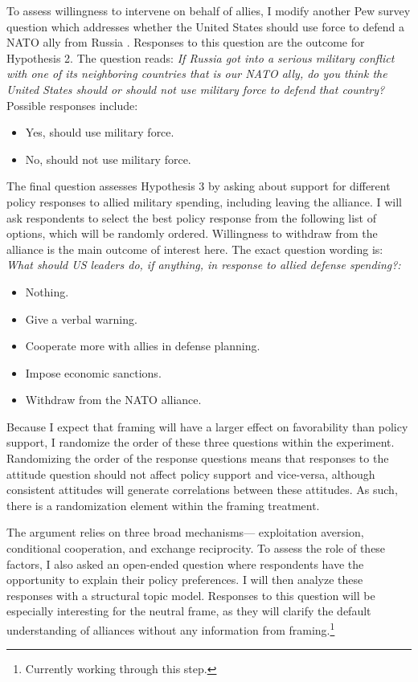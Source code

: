 \documentclass[12pt]{article}
\begin{document}
To assess willingness to intervene on behalf of allies, I modify another Pew survey question which addresses whether the United States should use force to defend a NATO ally from Russia \citep{PewNATO2020}. 
Responses to this question are the outcome for Hypothesis 2.  
The question reads: \textit{If Russia got into a serious military conflict with one of its neighboring countries that is our NATO ally, do you think the United States should or should not use military force to defend that country?}
Possible responses include: 
\begin{itemize}
\item Yes, should use military force.  
\item No, should not use military force.   
\end{itemize}


The final question assesses Hypothesis 3 by asking about support for different policy responses to allied military spending, including leaving the alliance. 
I will ask respondents to select the best policy response from the following list of options, which will be randomly ordered. 
Willingness to withdraw from the alliance is the main outcome of interest here. 
The exact question wording is: \textit{What should US leaders do, if anything, in response to allied defense spending?:} 
\begin{itemize}
\item Nothing. 
\item Give a verbal warning.
\item Cooperate more with allies in defense planning.
\item Impose economic sanctions.
\item Withdraw from the NATO alliance. 
\end{itemize}


Because I expect that framing will have a larger effect on favorability than policy support, I randomize the order of these three questions within the experiment. 
Randomizing the order of the response questions means that responses to the attitude question should not affect policy support and vice-versa, although consistent attitudes will generate correlations between these attitudes.
As such, there is a randomization element within the framing treatment.  


The argument relies on three broad mechanisms--- exploitation aversion, conditional cooperation, and exchange reciprocity. 
To assess the role of these factors, I also asked an open-ended question where respondents have the opportunity to explain their policy preferences.
I will then analyze these responses with a structural topic model. %
Responses to this question will be especially interesting for the neutral frame, as they will clarify the default understanding of alliances without any information from framing.\footnote{Currently working through this step.}
\end{document}
